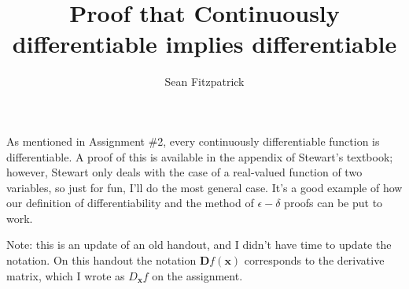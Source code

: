 \documentclass[12pt,letterpaper]{article}
\title{Proof that Continuously differentiable implies differentiable}
\author{Sean Fitzpatrick}
\newcommand{\D}{\mathbf{D}}
\newcommand{\x}{\mathbf{x}}
\begin{document}
\maketitle

As mentioned in Assignment \#2, every continuously differentiable function is differentiable. A proof of this is available in the appendix of Stewart's textbook; however, Stewart only deals with the case of a real-valued function of two variables, so just for fun, I'll do the most general case. It's a good example of how our definition of differentiability and the method of $\epsilon-\delta$ proofs can be put to work. 

Note: this is an update of an old handout, and I didn't have time to update the notation. On this handout the notation $\D f(\x)$ corresponds to the derivative matrix, which I wrote as $D_{\x}f$ on the assignment.
\end{document}
